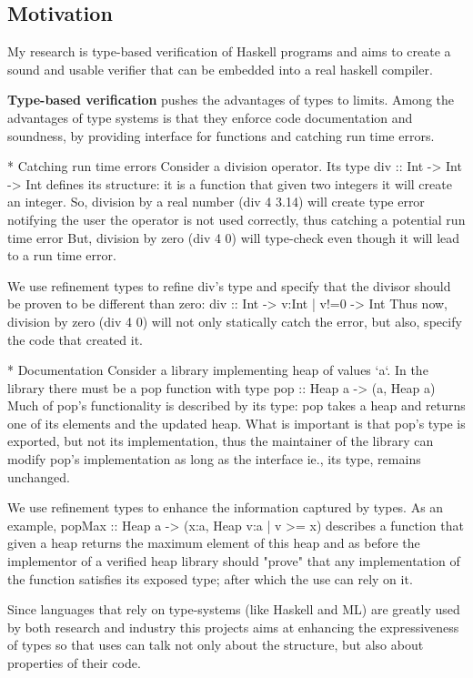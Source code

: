 \subsection*{Motivation}

My research is type-based verification of Haskell programs 
and aims to create a sound and usable verifier that can be
embedded into a real haskell compiler.

\textbf{Type-based verification} pushes the advantages of types to limits.
Among the advantages of type systems is that they enforce code documentation and soundness, by providing interface for functions and catching run time errors.

* Catching run time errors
Consider a division operator. Its type 
div :: Int -> Int -> Int
defines its structure: it is a function that given two integers it will create an integer.
%
So, division by a real number (div 4 3.14) will create type error notifying the user the operator is not used correctly, thus catching a potential run time error 
But, division by zero (div 4  0) will type-check even though it will lead to a run time error.

We use refinement types to refine div's type and specify that the divisor should be proven to be different than zero: 
div :: Int -> {v:Int | v!=0} -> Int
Thus now, division by zero (div 4 0) will not only statically catch the 
error, but also, specify the code that created it.

* Documentation
Consider a library implementing heap of values `a`.
In the library there must be a pop function with type
pop :: Heap a -> (a, Heap a)
Much of pop's functionality is described by its type:
pop takes a heap and returns one of its elements and the updated heap.
What is important is that pop's type is exported, but not its implementation, 
thus the maintainer of the library can modify pop's implementation  as long as the interface ie., its type, remains unchanged.


We use refinement types to enhance the information captured by types.
As an example, 
popMax :: Heap a -> (x:a, Heap {v:a | v >= x})
describes a function that given a heap returns the maximum element of this heap and as before the implementor of a verified heap library 
should "prove" that any implementation of the function satisfies its exposed type; after which the use can rely on it.


Since languages that rely on type-systems (like Haskell and ML) 
are greatly used by both research and industry this projects aims 
at enhancing the expressiveness of types 
so that uses can talk not only about the structure, but also about properties of their code.  



